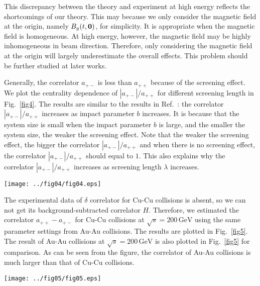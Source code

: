 \documentclass[a4paper,10pt,twoside]{cpc-hepnp}
\begin{document}
\begin{CJK*}{GBK}{song}
\begin{multicols}{2}
This discrepancy between the theory and experiment at high energy reflects the shortcomings of our theory. This may because we only consider the magnetic field at the origin, namely $B_y(t,\vb{0})$, for simplicity. It is appropriate when the magnetic field is homogeneous. At high energy, however, the magnetic field may be highly inhomogeneous in beam direction. Therefore, only considering the magnetic field at the origin will largely underestimate the overall effects. This problem should be further studied at later works.

Generally, the correlator $a_{+-}$ is less than $a_{++}$ because of the screening effect. We plot the centrality dependence of $|a_{+-}|/a_{++}$ for different screening length in Fig.~\ref{fig4}. The results are similar to the results in Ref.~\cite{Kharzeev:2007jp}: the correlator $|a_{+-}|/a_{++}$ increases as impact parameter $b$ increases. It is because that the system size is small when the impact parameter $b$ is large, and the smaller the system size, the weaker the screening effect. Note that the weaker the screening effect, the bigger the correlator $|a_{+-}|/a_{++}$ and when there is no screening effect, the correlator $|a_{+-}|/a_{++}$ should equal to $1$. This also explains why the correlator $|a_{+-}|/a_{++}$ increases as screening length $\lambda$ increases.

\begin{center}
\texttt{[image: ../fig04/fig04.eps]}
\end{center}

The experimental data of $\delta$ correlator for Cu-Cu collisions is absent, so we can not get its background-subtracted correlator $H$. Therefore, we estimated the correlator $a_{++} - a_{+-}$ for Cu-Cu collisions at $\sqrt{s} = 200\,\mathrm{GeV}$ using the same parameter settings from Au-Au collisions. The results are plotted in Fig.~\ref{fig5}. The result of Au-Au collisions at $\sqrt{s} = 200\,\mathrm{GeV}$ is also plotted in Fig.~\ref{fig5} for comparison. As can be seen from the figure, the correlator of Au-Au collisions is much larger than that of Cu-Cu collisions.

\begin{center}
\texttt{[image: ../fig05/fig05.eps]}
\end{center}


\end{multicols}
\end{CJK*}
\end{document}
